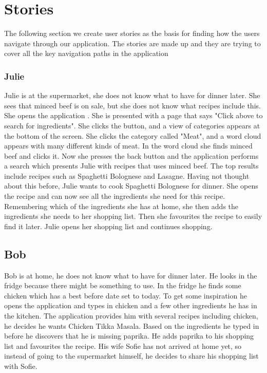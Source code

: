 \section{Stories}
The following section we create user stories as the basis for finding how the users navigate through our application. The stories are made up and they are trying to cover all the key navigation paths in the application

\subsubsection*{Julie}

Julie is at the supermarket, she does not know what to have for dinner later. She sees that minced beef is on sale, but she does not know what recipes include this. She opens the application \appname. She is presented with a page that says "Click above to search for ingredients". She clicks the button, and a view of categories appears at the bottom of the screen. She clicks the category called "Meat", and a word cloud appears with many different kinds of meat. In the word cloud she finds minced beef and clicks it. Now she presses the back button and the application performs a search which presents Julie with recipes that uses minced beef. The top results include recipes such as Spaghetti Bolognese and Lasagne. Having not thought about this before, Julie wants to cook Spaghetti Bolognese for dinner. She opens the recipe and can now see all the ingredients she need for this recipe. Remembering which of the ingredients she has at home, she then adds the ingredients she needs to her shopping list. Then she favourites the recipe to easily find it later. Julie opens her shopping list and continues shopping.

\subsection*{Bob}
Bob is at home, he does not know what to have for dinner later. He looks in the fridge because there might be something to use. In the fridge he finds some chicken which has a best before date set to today. To get some inspiration he opens the application and types in chicken and a few other ingredients he has in the kitchen. The application provides him with several recipes including chicken, he decides he wants Chicken Tikka Masala. Based on the ingredients he typed in before he discovers that he is missing paprika. He adds paprika to his shopping list and favourites the recipe. His wife Sofie has not arrived at home yet, so instead of going to the supermarket himself, he decides to share his shopping list with Sofie.

